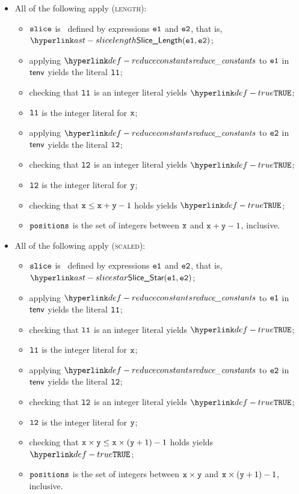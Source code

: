 \begin{itemize}
  \item All of the following apply (\textsc{length}):
  \begin{itemize}
    \item $\texttt{slice}$ is \lengthslice\ defined by expressions $\texttt{e1}$ and $\texttt{e2}$, that is, \\
          $\SliceLength(\veone, \vetwo)$;
    \item applying $\reduceconstants$ to $\texttt{e1}$ in $\textsf{tenv}$ yields the literal $\texttt{l1}$\ProseOrTypeError;
    \item checking that $\texttt{l1}$ is an integer literal yields $\True$\ProseTerminateAs{\IntConstantExpected};
    \item $\texttt{l1}$ is the integer literal for $\texttt{x}$;
    \item applying $\reduceconstants$ to $\texttt{e2}$ in $\textsf{tenv}$ yields the literal $\texttt{l2}$\ProseOrTypeError;
    \item checking that $\texttt{l2}$ is an integer literal yields $\True$\ProseTerminateAs{\IntConstantExpected};
    \item $\texttt{l2}$ is the integer literal for $\texttt{y}$;
    \item checking that $\texttt{x} \leq \texttt{x}+\texttt{y}-1$ holds yields $\True$\ProseTerminateAs{\BitfieldSliceReversed};
    \item $\texttt{positions}$ is the set of integers between $\texttt{x}$ and $\texttt{x}+\texttt{y}-1$, inclusive.
  \end{itemize}

  \item All of the following apply (\textsc{scaled}):
  \begin{itemize}
    \item $\texttt{slice}$ is \scaledslice\ defined by expressions $\texttt{e1}$ and $\texttt{e2}$, that is, \\
          $\SliceStar(\veone, \vetwo)$;
    \item applying $\reduceconstants$ to $\texttt{e1}$ in $\textsf{tenv}$ yields the literal $\texttt{l1}$\ProseOrTypeError;
    \item checking that $\texttt{l1}$ is an integer literal yields $\True$\ProseTerminateAs{\IntConstantExpected};
    \item $\texttt{l1}$ is the integer literal for $\texttt{x}$;
    \item applying $\reduceconstants$ to $\texttt{e2}$ in $\textsf{tenv}$ yields the literal $\texttt{l2}$\ProseOrTypeError;
    \item checking that $\texttt{l2}$ is an integer literal yields $\True$\ProseTerminateAs{\IntConstantExpected};
    \item $\texttt{l2}$ is the integer literal for $\texttt{y}$;
    \item checking that $\texttt{x} \times \texttt{y} \leq \texttt{x} \times (\texttt{y} + 1) - 1$ holds yields $\True$\ProseTerminateAs{\BitfieldSliceReversed};
    \item $\texttt{positions}$ is the set of integers between $\texttt{x} \times \texttt{y}$ and $\texttt{x} \times (\texttt{y} + 1) - 1$, inclusive.
  \end{itemize}
\end{itemize}
